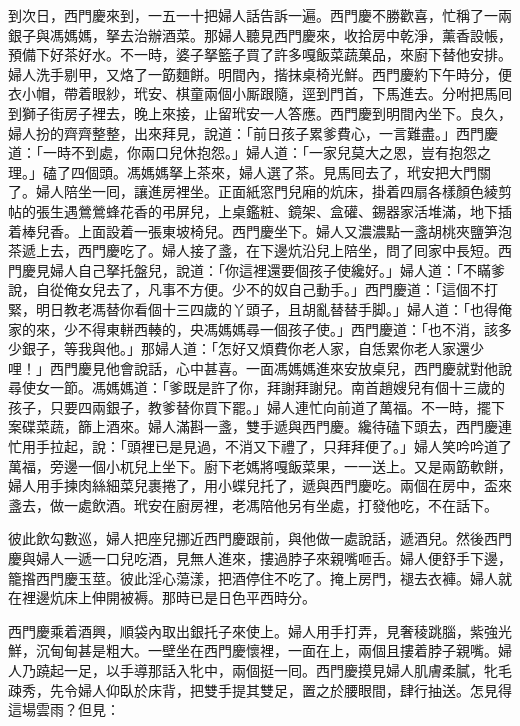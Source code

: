 到次日，西門慶來到，一五一十把婦人話告訴一遍。西門慶不勝歡喜，忙稱了一兩銀子與馮媽媽，拏去治辦酒菜。那婦人聽見西門慶來，收拾房中乾淨，薰香設帳，預備下好茶好水。不一時，婆子拏籃子買了許多嘎飯菜蔬菓品，來廚下替他安排。婦人洗手剔甲，又烙了一筯麵餅。明間內，揩抹桌椅光鮮。西門慶約下午時分，便衣小帽，帶着眼紗，玳安、棋童兩個小厮跟隨，逕到門首，下馬進去。分咐把馬囘到獅子街房子裡去，晚上來接，止留玳安一人答應。西門慶到明間內坐下。良久，婦人扮的齊齊整整，出來拜見，說道：「前日孩子累爹費心，一言難盡。」西門慶道：「一時不到處，你兩口兒休抱怨。」婦人道：「一家兒莫大之恩，豈有抱怨之理。」磕了四個頭。馮媽媽拏上茶來，婦人選了茶。見馬囘去了，玳安把大門關了。{}婦人陪坐一囘，讓進房裡坐。正面紙窓門兒廂的炕床，掛着四扇各樣顏色綾剪帖的張生遇鶯鶯蜂花香的弔屏兒，上桌鑑粧、鏡架、盒礶、錫器家活堆滿，地下插着棒兒香。{}上面設着一張東坡椅兒。{}西門慶坐下。婦人又濃濃點一盞胡桃夾鹽笋泡茶遞上去，西門慶吃了。婦人接了盞，在下邊炕沿兒上陪坐，問了囘家中長短。西門慶見婦人自己拏托盤兒，說道：「你這裡還要個孩子使纔好。」婦人道：「不瞞爹說，自從俺女兒去了，凡事不方便。少不的奴自己動手。」西門慶道：「這個不打緊，明日教老馮替你看個十三四歲的丫頭子，且胡亂替替手脚。」婦人道：「也得俺家的來，少不得東軿西輳的，{}央馮媽媽尋一個孩子使。」西門慶道：「也不消，該多少銀子，等我與他。」那婦人道：「怎好又煩費你老人家，自恁累你老人家還少哩！」西門慶見他會說話，心中甚喜。一面馮媽媽進來安放桌兒，西門慶就對他說尋使女一節。馮媽媽道：「爹既是許了你，拜謝拜謝兒。南首趙嫂兒有個十三歲的孩子，只要四兩銀子，教爹替你買下罷。」婦人連忙向前道了萬福。不一時，擺下案碟菜蔬，篩上酒來。婦人滿斟一盞，雙手遞與西門慶。纔待磕下頭去，西門慶連忙用手拉起，說：「頭裡已是見過，不消又下禮了，只拜拜便了。」婦人笑吟吟道了萬福，旁邊一個小杌兒上坐下。廚下老媽將嘎飯菜果，一一送上。又是兩筯軟餅，婦人用手揀肉絲細菜兒裹捲了，用小蝶兒托了，遞與西門慶吃。兩個在房中，盃來盞去，做一處飲酒。玳安在廚房裡，老馮陪他另有坐處，打發他吃，不在話下。

彼此飲勾數巡，婦人把座兒挪近西門慶跟前，{}與他做一處說話，遞酒兒。然後西門慶與婦人一遞一口兒吃酒，見無人進來，摟過脖子來親嘴咂舌。婦人便舒手下邊，籠揝西門慶玉莖。彼此淫心蕩漾，把酒停住不吃了。掩上房門，褪去衣褲。婦人就在裡邊炕床上伸開被褥。那時已是日色平西時分。

西門慶乘着酒興，順袋內取出銀托子來使上。婦人用手打弄，見奢稜跳腦，紫強光鮮，沉甸甸甚是粗大。一壁坐在西門慶懷裡，一面在上，兩個且摟着脖子親嘴。婦人乃蹺起一足，以手導那話入牝中，兩個挺一囘。西門慶摸見婦人肌膚柔膩，牝毛疎秀，先令婦人仰臥於床背，把雙手提其雙足，置之於腰眼間，肆行抽送。怎見得這場雲雨？但見：


